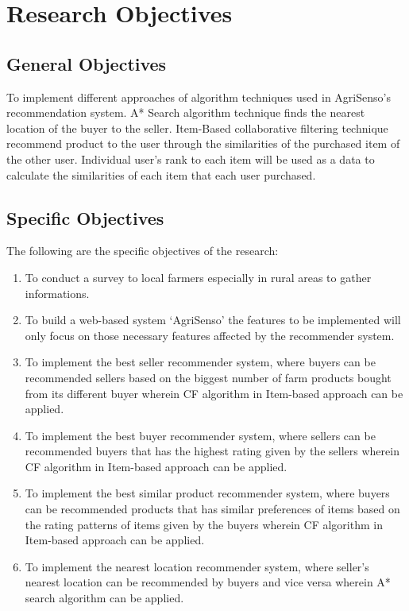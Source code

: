\documentclass{report}
\begin{document}
\section{Research Objectives}
\subsection{General Objectives}
To implement different approaches of algorithm techniques used in AgriSenso’s
recommendation system. A* Search algorithm technique finds the nearest location of the buyer
to the seller. Item-Based collaborative filtering technique recommend product to the user
through the similarities of the purchased item of the other user. Individual user’s rank to each
item will be used as a data to calculate the similarities of each item that each user purchased.

\subsection{Specific Objectives}
The following are the specific objectives of the research: 
\begin{enumerate} 
	\item To conduct a survey to local farmers especially in rural areas to gather informations.
	\item To build a web-based system ‘AgriSenso’ the features to be implemented will only focus
on those necessary features affected by the recommender system.
	\item To implement the best seller recommender system, where buyers can be recommended
sellers based on the biggest number of farm products bought from its different buyer
wherein CF algorithm in Item-based approach can be applied.
	\item To implement the best buyer recommender system, where sellers can be recommended
buyers that has the highest rating given by the sellers wherein CF algorithm in
Item-based approach can be applied.
	\item To implement the best similar product recommender system, where buyers can be
recommended products that has similar preferences of items based on the rating
patterns of items given by the buyers wherein CF algorithm in Item-based approach can
be applied.
	\item To implement the nearest location recommender system, where seller’s nearest
location can be recommended by buyers and vice versa wherein A* search algorithm
can be applied.
\end{enumerate}
\end{document}
